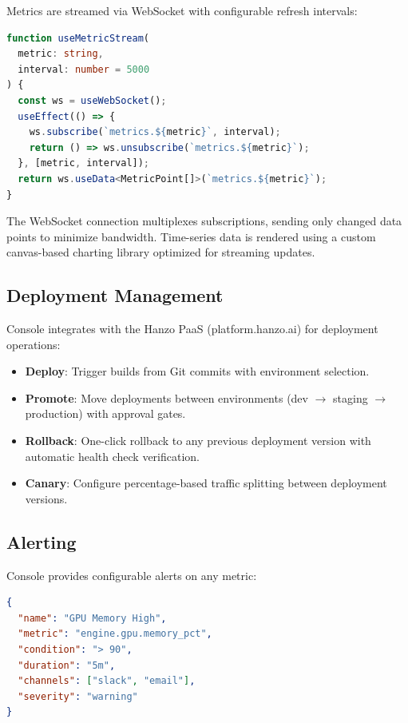 \documentclass[11pt,twocolumn]{article}
\begin{document}
Metrics are streamed via WebSocket with configurable refresh intervals:

\begin{lstlisting}[language=TypeScript]
function useMetricStream(
  metric: string,
  interval: number = 5000
) {
  const ws = useWebSocket();
  useEffect(() => {
    ws.subscribe(`metrics.${metric}`, interval);
    return () => ws.unsubscribe(`metrics.${metric}`);
  }, [metric, interval]);
  return ws.useData<MetricPoint[]>(`metrics.${metric}`);
}
\end{lstlisting}

The WebSocket connection multiplexes subscriptions, sending only changed data points to minimize bandwidth. Time-series data is rendered using a custom canvas-based charting library optimized for streaming updates.

\subsection{Deployment Management}

Console integrates with the Hanzo PaaS (platform.hanzo.ai) for deployment operations:

\begin{itemize}
    \item \textbf{Deploy}: Trigger builds from Git commits with environment selection.
    \item \textbf{Promote}: Move deployments between environments (dev $\rightarrow$ staging $\rightarrow$ production) with approval gates.
    \item \textbf{Rollback}: One-click rollback to any previous deployment version with automatic health check verification.
    \item \textbf{Canary}: Configure percentage-based traffic splitting between deployment versions.
\end{itemize}

\subsection{Alerting}

Console provides configurable alerts on any metric:

\begin{lstlisting}[language=JSON]
{
  "name": "GPU Memory High",
  "metric": "engine.gpu.memory_pct",
  "condition": "> 90",
  "duration": "5m",
  "channels": ["slack", "email"],
  "severity": "warning"
}
\end{lstlisting}
\end{document}
